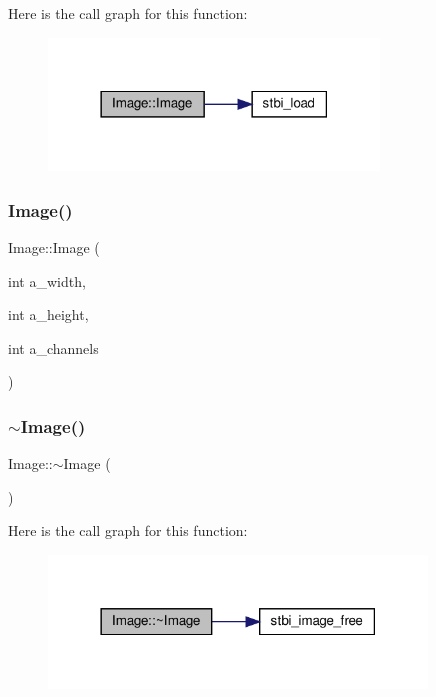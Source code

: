 Here is the call graph for this function\+:\nopagebreak
\begin{figure}[H]
\begin{center}
\leavevmode
\includegraphics[width=249pt]{structImage_a9a7eb017b8c9babc495030a6d5e34e5a_cgraph}
\end{center}
\end{figure}
\mbox{\label{structImage_ad04e368629b03afab0737f1b523947f9}} 
\subsubsection{\texorpdfstring{Image()}{Image()}\hspace{0.1cm}{\footnotesize\ttfamily [2/2]}}
{\footnotesize\ttfamily Image\+::\+Image (\begin{DoxyParamCaption}\item[{int}]{a\+\_\+width,  }\item[{int}]{a\+\_\+height,  }\item[{int}]{a\+\_\+channels }\end{DoxyParamCaption})}

\mbox{\label{structImage_a0294f63700543e11c0f0da85601c7ae5}} 
\subsubsection{\texorpdfstring{$\sim$\+Image()}{~Image()}}
{\footnotesize\ttfamily Image\+::$\sim$\+Image (\begin{DoxyParamCaption}{ }\end{DoxyParamCaption})}

Here is the call graph for this function\+:\nopagebreak
\begin{figure}[H]
\begin{center}
\leavevmode
\includegraphics[width=285pt]{structImage_a0294f63700543e11c0f0da85601c7ae5_cgraph}
\end{center}
\end{figure}


